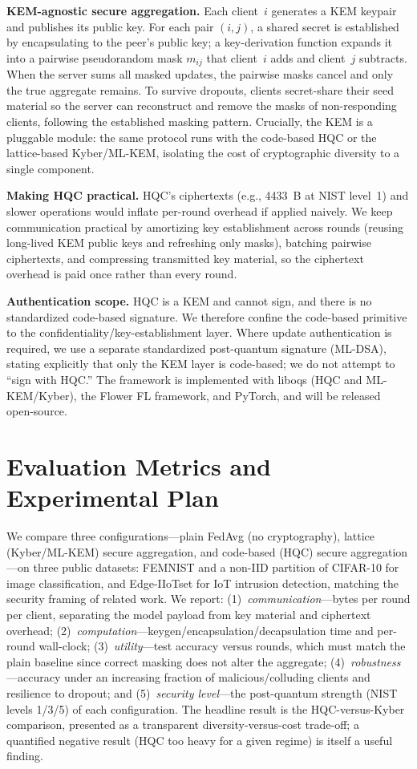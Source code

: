 \documentclass[conference]{IEEEtran}
\begin{document}
\textbf{KEM-agnostic secure aggregation.} Each client~$i$ generates a KEM keypair and
publishes its public key. For each pair $(i,j)$, a shared secret is established by
encapsulating to the peer's public key; a key-derivation function expands it into a
pairwise pseudorandom mask $m_{ij}$ that client~$i$ adds and client~$j$ subtracts. When
the server sums all masked updates, the pairwise masks cancel and only the true aggregate
remains. To survive dropouts, clients secret-share their seed material so the server can
reconstruct and remove the masks of non-responding clients, following the established
masking pattern. Crucially, the KEM is a pluggable module: the same protocol runs with the
code-based HQC or the lattice-based Kyber/ML-KEM, isolating the cost of cryptographic
diversity to a single component.

\textbf{Making HQC practical.} HQC's ciphertexts (e.g., 4433~B at NIST level~1) and slower
operations would inflate per-round overhead if applied naively. We keep communication
practical by amortizing key establishment across rounds (reusing long-lived KEM public keys
and refreshing only masks), batching pairwise ciphertexts, and compressing transmitted key
material, so the ciphertext overhead is paid once rather than every round.

\textbf{Authentication scope.} HQC is a KEM and cannot sign, and there is no standardized
code-based signature. We therefore confine the code-based primitive to the
confidentiality/key-establishment layer. Where update authentication is required, we use a
separate standardized post-quantum signature (ML-DSA), stating explicitly that only the KEM
layer is code-based; we do not attempt to ``sign with HQC.'' The framework is implemented
with liboqs (HQC and ML-KEM/Kyber), the Flower FL framework, and PyTorch, and will be
released open-source.

\section{Evaluation Metrics and Experimental Plan}
We compare three configurations---plain FedAvg (no cryptography), lattice (Kyber/ML-KEM)
secure aggregation, and code-based (HQC) secure aggregation---on three public datasets:
FEMNIST and a non-IID partition of CIFAR-10 for image classification, and Edge-IIoTset for
IoT intrusion detection, matching the security framing of related work. We report:
(1)~\emph{communication}---bytes per round per client, separating the model payload from key
material and ciphertext overhead; (2)~\emph{computation}---keygen/encapsulation/decapsulation
time and per-round wall-clock; (3)~\emph{utility}---test accuracy versus rounds, which must
match the plain baseline since correct masking does not alter the aggregate;
(4)~\emph{robustness}---accuracy under an increasing fraction of malicious/colluding clients
and resilience to dropout; and (5)~\emph{security level}---the post-quantum strength (NIST
levels 1/3/5) of each configuration. The headline result is the HQC-versus-Kyber comparison,
presented as a transparent diversity-versus-cost trade-off; a quantified negative result
(HQC too heavy for a given regime) is itself a useful finding.
\end{document}
